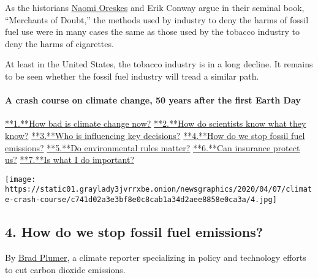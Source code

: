 As the historians
\href{https://www.nytimes3xbfgragh.onion/2015/06/16/science/naomi-oreskes-a-lightning-rod-in-a-changing-climate.html}{Naomi
Oreskes} and Erik Conway argue in their seminal book, ``Merchants of
Doubt,'' the methods used by industry to deny the harms of fossil fuel
use were in many cases the same as those used by the tobacco industry to
deny the harms of cigarettes.

At least in the United States, the tobacco industry is in a long
decline. It remains to be seen whether the fossil fuel industry will
tread a similar path.

\hypertarget{a-crash-course-on-climate-change-50-years-after-the-first-earth-day-3}{%
\paragraph{A crash course on climate change, 50 years after the first
Earth
Day}\label{a-crash-course-on-climate-change-50-years-after-the-first-earth-day-3}}

\href{/interactive/2020/04/19/climate/climate-crash-course-1.html}{**1.**How
bad is climate change now?}
\href{/interactive/2020/04/19/climate/climate-crash-course-2.html}{**2.**How
do scientists know what they know?}
\href{/interactive/2020/04/19/climate/climate-crash-course-3.html}{**3.**Who
is influencing key decisions?}
\href{/interactive/2020/04/19/climate/climate-crash-course-4.html}{**4.**How
do we stop fossil fuel emissions?}
\href{/interactive/2020/04/19/climate/climate-crash-course-5.html}{**5.**Do
environmental rules matter?}
\href{/interactive/2020/04/19/climate/climate-crash-course-6.html}{**6.**Can
insurance protect us?}
\href{/interactive/2020/04/19/climate/climate-crash-course-7.html}{**7.**Is
what I do important?}

\texttt{[image: https://static01.graylady3jvrrxbe.onion/newsgraphics/2020/04/07/climate-crash-course/c741d02a3e3bf8e0c8cab1a34d2aee8858e0ca3a/4.jpg]}

\hypertarget{4-how-do-we-stop-fossil-fuel-emissions}{%
\subsection{\texorpdfstring{\textbf{4.} How do we stop fossil fuel
emissions?}{4. How do we stop fossil fuel emissions?}}\label{4-how-do-we-stop-fossil-fuel-emissions}}

By \href{https://www.nytimes3xbfgragh.onion/by/brad-plumer}{Brad
Plumer}, a climate reporter specializing in policy and technology
efforts to cut carbon dioxide emissions.

